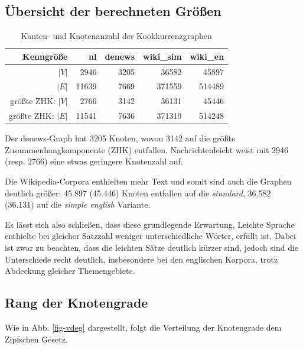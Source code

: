 \documentclass[11pt, a4paper]{article}
\begin{document}
\subsection{Übersicht der berechneten Größen}
\begin{table}[ht]
    \begin{tabular}{*{5}{r}}
    \toprule
    Kenngröße                     & nl        & denews    & wiki\_sim & wiki\_en \\
    \midrule
    $|V|$                         & 2946      & 3205      & 36582     & 45897  \\
    $|E|$                         & 11639     & 7669      & 371559    & 514489 \\
    größte ZHK: $|V|$             & 2766      & 3142      & 36131     & 45446  \\
    größte ZHK: $|E|$             & 11541     & 7636      & 371319    & 514248 \\
    \bottomrule
    \end{tabular}
    \caption{Kanten- und Knotenanzahl der Kookkurrenzgraphen}
    \label{tab-zsf}
\end{table}

Der denews-Graph hat 3205 Knoten, wovon 3142 auf die größte
Zusammenhangkomponente (ZHK) entfallen.
Nachrichtenleicht weist mit 2946 (resp. 2766) eine etwas geringere
Knotenzahl auf.

Die Wikipedia-Corpora enthielten mehr Text und somit sind auch die Graphen
deutlich größer: 45.897 (45.446) Knoten entfallen auf die \emph{standard},
36.582 (36.131) auf die \emph{simple english} Variante.

Es l\"asst sich also schlie\ss{}en, dass diese grundlegende Erwartung,
Leichte Sprache enthielte bei gleicher Satzzahl weniger unterschiedliche Wörter,
erf\"ullt ist. Dabei ist zwar zu beachten, dass die leichten Sätze deutlich kürzer sind, jedoch sind die Unterschiede recht deutlich, insbesondere bei den englischen Korpora, trotz Abdeckung gleicher Themengebiete. 


\subsection{Rang der Knotengrade}

Wie in Abb. \ref{fig-vdeg} dargestellt, folgt die Verteilung der Knotengrade
dem Zipfschen Gesetz.
\end{document}
